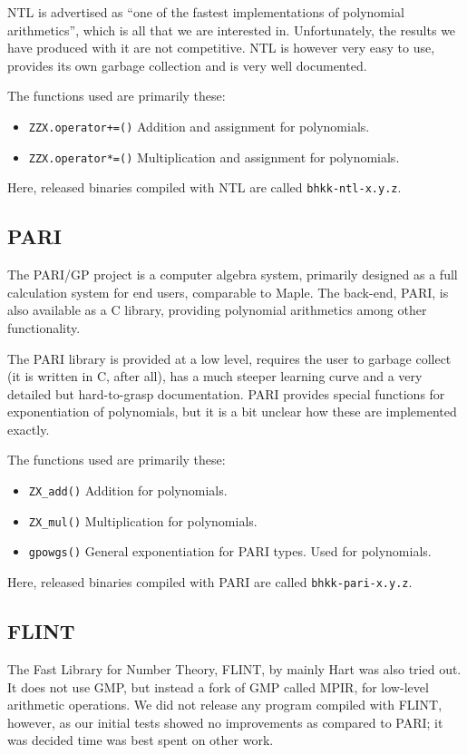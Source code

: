 \documentclass{cslthse-msc}
\newcommand{\code}{\texttt}
\begin{document}
NTL is advertised as ``one of the fastest implementations of polynomial arithmetics'', which is all that we are interested in. Unfortunately, the results we have produced with it are not competitive. NTL is however very easy to use, provides its own garbage collection and is very well documented.

The functions used are primarily these: 

\begin{itemize}
\item \code{ZZX.operator+=()}
\subitem Addition and assignment for polynomials. %
\item \code{ZZX.operator*=()}
\subitem Multiplication and assignment for polynomials. %
\end{itemize}

Here, released binaries compiled with NTL are called \code{bhkk-ntl-x.y.z}.

\subsection{PARI}
The PARI/GP project \cite{pari} is a computer algebra system, primarily designed as a full calculation system for end users, comparable to Maple. The back-end, PARI, is also available as a C library, providing polynomial arithmetics among other functionality.

The PARI library is provided at a low level, requires the user to garbage collect (it is written in C, after all), has a much steeper learning curve and a very detailed but hard-to-grasp documentation. PARI provides special functions for exponentiation of polynomials, but it is a bit unclear how these are implemented exactly.

The functions used are primarily these: 

\begin{itemize}
\item \code{ZX\_add()}
\subitem Addition for polynomials. %
\item \code{ZX\_mul()}
\subitem Multiplication for polynomials. %
\item \code{gpowgs()}
\subitem General exponentiation for PARI types. Used for polynomials.
\end{itemize}

Here, released binaries compiled with PARI are called \code{bhkk-pari-x.y.z}.

\subsection{FLINT}
The Fast Library for Number Theory, FLINT, by mainly Hart \cite{flint} was also tried out. It does not use GMP, but instead a fork of GMP called MPIR, for low-level arithmetic operations. We did not release any program compiled with FLINT, however, as our initial tests showed no improvements as compared to PARI; it was decided time was best spent on other work.
\end{document}
